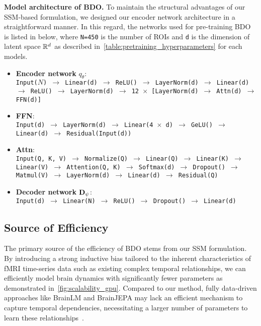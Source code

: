 \textbf{Model architecture of BDO.}
To maintain the structural advantages of our SSM-based formulation, we designed our encoder network architecture in a straightforward manner. In this regard, the networks used for pre-training BDO is listed in below, where \texttt{N=450} is the number of ROIs and \texttt{d} is the dimension of latent space $\mathbb{R}^d$ as described in~\cref{table:pretraining_hyperparameters} for each models.
\vspace{-3mm}
\begin{itemize}
    \item \textbf{Encoder network} $q_{\theta}$: \\
    \texttt{Input($N$) $\to$ Linear(d) $\to$ ReLU() $\to$ LayerNorm(d) $\to$ Linear(d) $\to$ ReLU() $\to$ LayerNorm(d) $\to$ 12 $\times$ [LayerNorm(d) $\to$ Attn(d) $\to$ FFN(d)]}
    \item \textbf{FFN}: 
    \\
    \texttt{Input(d) $\to$ LayerNorm(d) $\to$ Linear(4 $\times$ d) $\to$ GeLU() $\to$ Linear(d) $\to$ Residual(Input(d))}
    \item \textbf{Attn}: 
    \\
    \texttt{Input(Q, K, V) $\to$ Normalize(Q) $\to$ Linear(Q) $\to$ Linear(K) $\to$ Linear(V) $\to$ Attention(Q, K) $\to$ Softmax(d) $\to$ Dropout() $\to$ Matmul(V) $\to$ LayerNorm(d) $\to$ Linear(d) $\to$ Residual(Q)}
    \item \textbf{Decoder network} $\mathbf{D}_{\psi}$: \\
    \texttt{Input(d) $\to$ Linear(N) $\to$ ReLU() $\to$ Dropout() $\to$ Linear(d)}
\end{itemize}


\subsection{Source of Efficiency}\label{sec:source_efficiency} 
The primary source of the efficiency of BDO stems from our SSM formulation. By introducing a strong inductive bias tailored to the inherent characteristics of fMRI time-series data such as existing complex temporal relationships, we can efficiently model brain dynamics with significantly fewer parameters as demonstrated in~\cref{fig:scalability_gpu}. Compared to our method, fully data-driven approaches like BrainLM and BrainJEPA may lack an efficient mechanism to capture temporal dependencies, necessitating a larger number of parameters to learn these relationships~\citep{caro2024brainlm, dong2024brain}.

